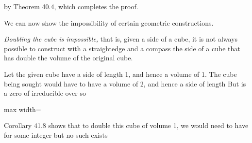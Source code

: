 \documentclass[11pt,oneside]{article}
\begin{document}
\begin{BookBody}
\noindent by Theorem 40.4, which completes the proof. \BookEnd{\blacklozenge}


\noindent We can now show the impossibility of certain geometric constructions.

 \textit{Doubling the cube is impossible,} that is, given a side of a cube, it is not always possible to construct with a straightedge and a compass the side of a cube that has double the volume of the original cube.

 Let the given cube have a side of length 1, and hence a volume of 1. The cube being sought would have to have a volume of 2, and hence a side of length  But  is a zero of irreducible  over  so

\begin{center}\begin{adjustbox}{max width=\linewidth}\end{adjustbox}\end{center}

\noindent Corollary 41.8 shows that to double this cube of volume 1, we would need to have  for some integer  but no such  exists\BookEnd{\blacklozenge}

\end{BookBody}

\BookNarrativetrue
\end{document}
